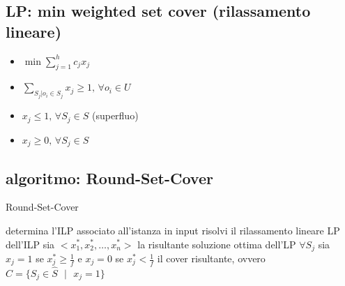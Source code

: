 
\subsection*{LP: min weighted set cover (rilassamento lineare)}
\begin{flushleft}
	\begin{itemize}
		\item $\min\sum_{j=1}^h c_jx_j$
		\item $\sum_{S_j\vert o_i\in S_j}x_j\geq 1\text{, }\forall o_i\in U$
		\item \sout{$x_j\leq 1\text{, }\forall S_j\in\hat{S}$} (superfluo)
		\item $x_j\geq 0\text{, }\forall S_j\in\hat{S}$
	\end{itemize}
\end{flushleft}


\newpage
\subsection*{algoritmo: Round-Set-Cover}
\begin{flushleft}
	\begin{algorithm}
		\caption{Round-Set-Cover}
		\begin{algorithmic}
			\STATE determina l'ILP associato all'istanza in input
			\STATE risolvi il rilassamento lineare LP dell'ILP
			\STATE sia $<x_1^*,x_2^*,\ldots,x_n^*>$ la risultante soluzione ottima dell'LP
			\STATE $\forall S_j$ sia $x_j=1$ se $x_j^*\geq\frac{1}{f}$ e $x_j=0$ se $x_j^*<\frac{1}{f}$
			\RETURN il cover risultante, ovvero $\hat{C}=\{S_j\in\hat{S}\text{ }\vert\text{ }x_j=1\}$
		\end{algorithmic}
	\end{algorithm}
\end{flushleft}


